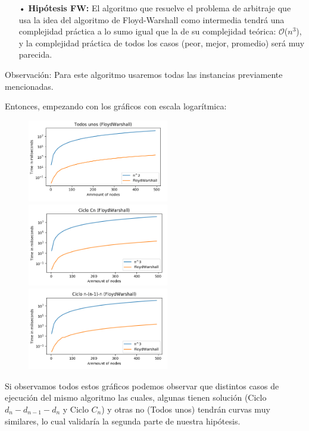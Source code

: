 \documentclass[11pt,a4paper]{article}
\begin{document}
\begin{itemize}
    \item[•] \textbf{Hip\'otesis FW:} El algoritmo que resuelve el problema de arbitraje que usa la idea del algoritmo de Floyd-Warshall como intermedia tendr\'a una complejidad pr\'actica a lo sumo igual que la de su complejidad te\'orica: $\mathcal{O}$($n^{3}$), y la complejidad pr\'actica de todos los casos (peor, mejor, promedio) ser\'a muy parecida.
\end{itemize}

Observaci\'on: Para este algoritmo usaremos todas las instancias previamente mencionadas.

Entonces, empezando con los gr\'aficos con escala logar\'itmica:


\begin{figure}[h]
    \includegraphics[width=0.55\textwidth]{FWlog-unos.png}
    \includegraphics[width=0.55\textwidth]{FWlog-cn.png}
    \includegraphics[width=0.55\textwidth]{FWlog-nnl1n.png}
\end{figure}

Si observamos todos estos gr\'aficos podemos observar que distintos casos de ejecuci\'on del mismo algoritmo las cuales, algunas tienen soluci\'on (Ciclo $d_{n}-d_{n-1}-d_{n}$ y Ciclo $C_{n}$) y otras no (Todos unos) tendr\'an curvas muy similares, lo cual validar\'ia la segunda parte de nuestra hip\'otesis. 
\end{document}
